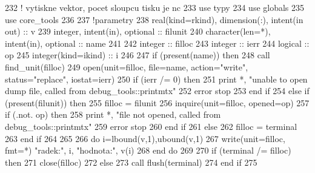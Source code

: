 \begin{DoxyCode}
232     \textcolor{comment}{! vytiskne vektor, pocet sloupcu tisku je nc}
233       \textcolor{keywordtype}{use }typy
234       \textcolor{keywordtype}{use }globals
235       \textcolor{keywordtype}{use }core_tools
236       
237       \textcolor{comment}{!parametry}
238       \textcolor{keywordtype}{real(kind=rkind)}, \textcolor{keywordtype}{dimension(:)}, \textcolor{keywordtype}{intent(in out)} :: v
239       \textcolor{keywordtype}{integer}, \textcolor{keywordtype}{intent(in)}, \textcolor{keywordtype}{optional} :: filunit   
240       \textcolor{keywordtype}{character(len=*)}, \textcolor{keywordtype}{intent(in)}, \textcolor{keywordtype}{optional} :: name
241 
242       \textcolor{keywordtype}{integer} :: filloc
243       \textcolor{keywordtype}{integer} :: ierr
244       \textcolor{keywordtype}{logical} :: op
245       \textcolor{keywordtype}{integer(kind=ikind)} :: i
246       
247       \textcolor{keywordflow}{if} (\textcolor{keyword}{present}(name)) \textcolor{keywordflow}{then}
248         \textcolor{keyword}{call }find_unit(filloc)
249         \textcolor{keyword}{open}(unit=filloc, file=name, action=\textcolor{stringliteral}{"write"}, status=\textcolor{stringliteral}{"replace"}, iostat=ierr)
250         \textcolor{keywordflow}{if} (ierr /= 0) \textcolor{keywordflow}{then}
251           print *, \textcolor{stringliteral}{"unable to open dump file, called from debug\_tools::printmtx"}
252           error stop
253 \textcolor{keywordflow}{        end if}
254       \textcolor{keywordflow}{else} \textcolor{keywordflow}{if} (\textcolor{keyword}{present}(filunit)) \textcolor{keywordflow}{then}
255         filloc = filunit
256         \textcolor{keyword}{inquire}(unit=filloc, opened=op)
257         \textcolor{keywordflow}{if} (.not. op) \textcolor{keywordflow}{then}
258           print *, \textcolor{stringliteral}{"file not opened, called from debug\_tools::printmtx"}
259           error stop
260 \textcolor{keywordflow}{        end if}
261       \textcolor{keywordflow}{else}
262         filloc = terminal
263 \textcolor{keywordflow}{      end if}
264      
265 
266       \textcolor{keywordflow}{do} i=lbound(v,1),ubound(v,1)
267          \textcolor{keyword}{write}(unit=filloc, fmt=*) \textcolor{stringliteral}{"radek:"}, i, \textcolor{stringliteral}{"hodnota:"}, v(i)
268 \textcolor{keywordflow}{      end do}
269 
270       \textcolor{keywordflow}{if} (terminal /= filloc) \textcolor{keywordflow}{then}
271         \textcolor{keyword}{close}(filloc)
272       \textcolor{keywordflow}{else}
273         \textcolor{keyword}{call }flush(terminal)
274 \textcolor{keywordflow}{      end if}
275   
\end{DoxyCode}
